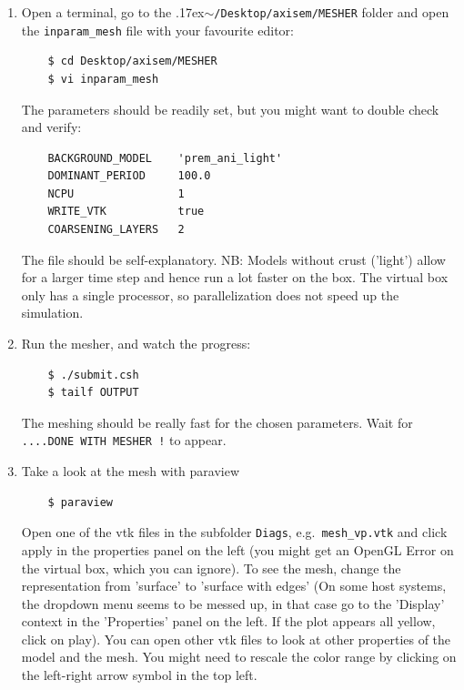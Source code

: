 \documentclass{article}
\newcommand{\ttilde}[0]{\raise.17ex\hbox{$\scriptstyle\sim$}}
\begin{document}
\begin{enumerate}
    \item Open a terminal, go to the \ttilde\verb|/Desktop/axisem/MESHER| folder and open
    the \verb|inparam_mesh| file with your favourite editor:
    \begin{verbatim}
    $ cd Desktop/axisem/MESHER
    $ vi inparam_mesh
    \end{verbatim}
    The parameters should be readily set, but you might want to double check and verify:
    \begin{verbatim}
    BACKGROUND_MODEL    'prem_ani_light'
    DOMINANT_PERIOD     100.0
    NCPU                1
    WRITE_VTK           true
    COARSENING_LAYERS   2
    \end{verbatim}
    The file should be self-explanatory. NB: Models without crust ('light') allow for a
    larger time step and hence run a lot faster on the box. The virtual box only has a
    single processor, so parallelization does not speed up the simulation.

    \item Run the mesher, and watch the progress:
    \begin{verbatim}
    $ ./submit.csh
    $ tailf OUTPUT
    \end{verbatim}
    The meshing should be really fast for the chosen parameters. Wait for
    \verb|....DONE WITH MESHER !| to appear.

    \item Take a look at the mesh with paraview
    \begin{verbatim}
    $ paraview
    \end{verbatim}
    Open one of the vtk files in the subfolder \verb|Diags|, e.g.\
    \verb|mesh_vp.vtk| and click apply in the properties panel on the left (you
    might get an OpenGL Error on the virtual box, which you can ignore). To see
    the mesh, change the representation from 'surface' to 'surface with edges'
    (On some host systems, the dropdown menu seems to be messed up, in that
    case go to the 'Display' context in the 'Properties' panel on the left. If
    the plot appears all yellow, click on play).  You can open other vtk files
    to look at other properties of the model and the mesh. You might need to
    rescale the color range by clicking on the left-right arrow symbol in the
    top left.


\end{enumerate}
\end{document}
